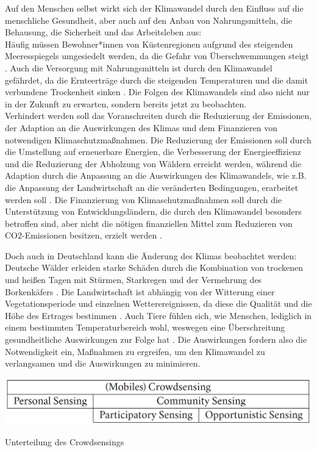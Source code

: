 Auf den Menschen selbst wirkt sich der Klimawandel durch den Einfluss auf die menschliche Gesundheit, aber auch auf den Anbau von Nahrungsmitteln, die Behausung, die Sicherheit und das Arbeitsleben aus: \\ Häufig müssen Bewohner*innen von Küstenregionen aufgrund des steigenden Meeresspiegels umgesiedelt werden, da die Gefahr von Überschwemmungen steigt \cite{UnitedNationsClimateChange}. Auch die Versorgung mit Nahrungsmitteln ist durch den Klimawandel gefährdet, da die Ernteerträge durch die steigenden Temperaturen und die damit verbundene Trockenheit sinken \cite{UnitedNationsClimateChange}. Die Folgen des Klimawandels sind also nicht nur in der Zukunft zu erwarten, sondern bereits jetzt zu beobachten. \\ Verhindert werden soll das Voranschreiten durch die Reduzierung der Emissionen, der Adaption an die Auswirkungen des Klimas und dem Finanzieren von notwendigen Klimaschutzmaßnahmen. Die Reduzierung der Emissionen soll durch die Umstellung auf erneuerbare Energien, die Verbesserung der Energieeffizienz und die Reduzierung der Abholzung von Wäldern erreicht werden, während die Adaption durch die Anpassung an die Auswirkungen des Klimawandels, wie z.B. die Anpassung der Landwirtschaft an die veränderten Bedingungen, erarbeitet werden soll \cite{UnitedNationsClimateChange}. Die Finanzierung von Klimaschutzmaßnahmen soll durch die Unterstützung von Entwicklungsländern, die durch den Klimawandel besonders betroffen sind, aber nicht die nötigen finanziellen Mittel zum Reduzieren von CO2-Emissionen besitzen, erzielt werden \cite{UnitedNationsClimateChange}.


Doch auch in Deutschland kann die Änderung des Klimas beobachtet werden: Deutsche Wälder erleiden starke Schäden durch die Kombination von trockenen und heißen Tagen mit Stürmen, Starkregen und der Vermehrung des Borkenkäfers \cite{UmweltbundesamtRisikoanalyse2021}. Die Landwirtschaft ist abhängig von der Witterung einer Vegetationsperiode und einzelnen Wetterereignissen, da diese die Qualität und die Höhe des Ertrages bestimmen \cite{UmweltbundesamtRisikoanalyse2021}. Auch Tiere fühlen sich, wie Menschen, lediglich in einem bestimmten Temperaturbereich wohl, weswegen eine Überschreitung gesundheitliche Auswirkungen zur Folge hat \cite{UmweltbundesamtRisikoanalyse2021}. Die Auswirkungen fordern also die Notwendigkeit ein, Maßnahmen zu ergreifen, um den Klimawandel zu verlangsamen und die Auswirkungen zu minimieren.

\begin{marginfigure}[] %
    \includegraphics[width=1.1\marginparwidth]{figures/crowdsensing.png}
    \caption{\label{fig:crowdsensing}Unterteilung des Crowdsensings}
\end{marginfigure}

